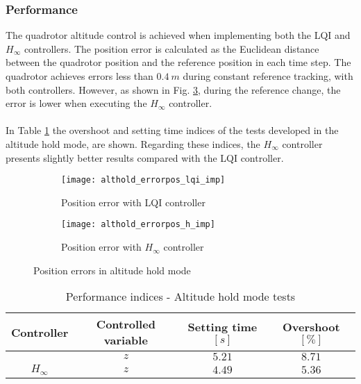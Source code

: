 \subsubsection{Performance}
The quadrotor altitude control is achieved when implementing both the LQI and $H_\infty$ controllers.
The position error is calculated as the Euclidean distance between the quadrotor position and the reference position in each time step. The quadrotor achieves errors less than $0.4\ m$ during constant reference tracking, with both controllers. However, as shown in Fig. \ref{fig:althold_errorpos_imp}, during the reference change, the error is lower when executing the $H_\infty$ controller.
\\\\
In Table \ref{tb:althold_index} the overshoot and setting time indices of the tests developed in the altitude hold mode, are shown. Regarding these indices, the $H_\infty$ controller presents slightly better results compared with the LQI controller.
\begin{figure}[hh]
\begin{subfigure}{.5\linewidth}
\centering
\texttt{[image: althold\_errorpos\_lqi\_imp]}
\caption{Position error with LQI controller}
\label{fig:althold_errorpos_lqi_imp}
\end{subfigure}%
\begin{subfigure}{.5\linewidth}
\centering
\texttt{[image: althold\_errorpos\_h\_imp]}
\caption{Position error with $H_\infty$ controller}
\label{fig:althold_errorpos_h_imp}
\end{subfigure}
\caption{Position errors in altitude hold mode}
\label{fig:althold_errorpos_imp}
\end{figure}
\begin{table}[h]
\small
\begin{center}
\caption{Performance indices - Altitude hold mode tests}\label{tb:althold_index}
\begin{tabular}{c|c|c|c}\hline
\rule{0pt}{3ex} Controller & Controlled variable & Setting time $[s]$ & Overshoot $[\%]$ \\\hline\hline
\rule{0pt}{3ex} 
\multirow{1}{*}{LQI} 
 & $z$ & $5.21$ & $8.71$ \\ \hline
\multirow{1}{*}{$H_\infty$} 
 & $z$ & $4.49$ & $5.36$ \\ \hline\hline
\end{tabular}
\end{center}
\end{table}

